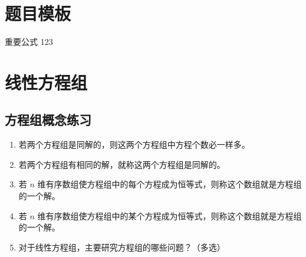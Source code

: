 \section{题目模板}

\begin{question}{重要公式}
	123
\end{question}

\section{线性方程组}

\subsection{方程组概念练习}

\begin{enumerate}
	\item 若两个方程组是同解的，则这两个方程组中方程个数必一样多。
	
	\item 若两个方程组有相同的解，就称这两个方程组是同解的。
	
	\item 若 $n$ 维有序数组使方程组中的每个方程成为恒等式，则称这个数组就是方程组的一个解。
	
	\item 若 $n$ 维有序数组使方程组中的某个方程成为恒等式，则称这个数组就是方程组的一个解。
	
	\item 对于线性方程组，主要研究方程组的哪些问题？（多选）
	

\end{enumerate}

